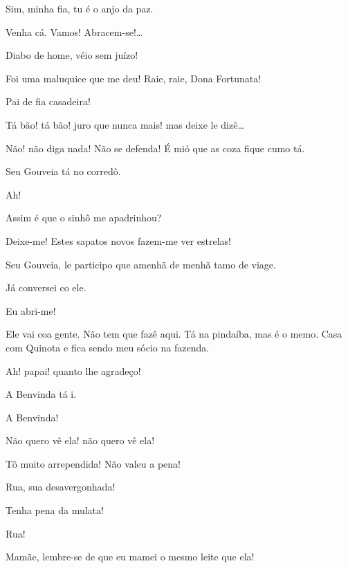  Sim, minha fia, tu é o anjo da paz.

  Venha cá. 
Vamos! Abracem-se!\ldots{}

  Diabo de home, véio sem juízo!

 Foi uma maluquice que me deu! Raie, raie, Dona Fortunata!

 Pai de fia casadeira!

 Tá bão! tá bão! juro que nunca mais! mas deixe le dizê\ldots{}

 Não! não diga nada! Não se defenda! É mió que as coza fique
cumo tá.

 Seu Gouveia tá no corredô.

 Ah! 

 Assim é que o sinhô me apadrinhou?

 Deixe-me! Estes sapatos novos fazem-me ver estrelas!

 Seu Gouveia, le participo que amenhã de menhã tamo de viage.

 Já conversei co ele.

  Eu abri-me!

 Ele vai coa gente. Não tem que fazê aqui. Tá na pindaíba, mas é o
memo. Casa com Quinota e fica sendo meu sócio na fazenda.

 Ah! papai! quanto lhe agradeço!

 A Benvinda tá i.

 A Benvinda!

 Não quero vê ela! não quero vê ela!



 Tô muito arrependida! Não valeu a pena!

 Rua, sua desavergonhada!

 Tenha pena da mulata!

 Rua!

 Mamãe, lembre-se de que eu mamei o mesmo leite que ela!

